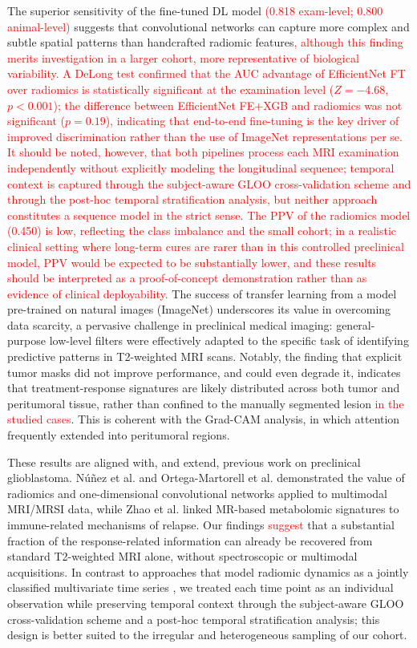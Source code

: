 \documentclass{article}
\begin{document}
The superior sensitivity of the fine-tuned DL model \textcolor{red}{(0.818 exam-level; 0.800 animal-level)} suggests that convolutional networks can capture more complex and subtle spatial patterns than handcrafted radiomic features\textcolor{red}{, although this finding merits investigation in a larger cohort, more representative of biological variability. A DeLong test confirmed that the AUC advantage of EfficientNet FT over radiomics is statistically significant at the examination level ($Z=-4.68$, $p<0.001$); the difference between EfficientNet FE+XGB and radiomics was not significant ($p=0.19$), indicating that end-to-end fine-tuning is the key driver of improved discrimination rather than the use of ImageNet representations per se.} \textcolor{red}{It should be noted, however, that both pipelines process each MRI examination independently without explicitly modeling the longitudinal sequence; temporal context is captured through the subject-aware GLOO cross-validation scheme and through the post-hoc temporal stratification analysis, but neither approach constitutes a sequence model in the strict sense.} \textcolor{red}{The PPV of the radiomics model (0.450) is low, reflecting the class imbalance and the small cohort; in a realistic clinical setting where long-term cures are rarer than in this controlled preclinical model, PPV would be expected to be substantially lower, and these results should be interpreted as a proof-of-concept demonstration rather than as evidence of clinical deployability.} The success of transfer learning from a model pre-trained on natural images (ImageNet) underscores its value in overcoming data scarcity, a pervasive challenge in preclinical medical imaging: general-purpose low-level filters were effectively adapted to the specific task of identifying predictive patterns in T2-weighted MRI scans. Notably, the finding that explicit tumor masks did not improve performance, and could even degrade it, indicates that treatment-response signatures are likely distributed across both tumor and peritumoral tissue, rather than confined to the manually segmented lesion \textcolor{red}{in the studied cases}. This is coherent with the Grad-CAM analysis, in which attention frequently extended into peritumoral regions.

These results are aligned with, and extend, previous work on preclinical glioblastoma. Núñez et al. \cite{interpretingLuisMiguel} and Ortega-Martorell et al. \cite{Ortega-Martorell2023} demonstrated the value of radiomics and one-dimensional convolutional networks applied to multimodal MRI/MRSI data, while Zhao et al. \cite{Zhao2023} linked MR-based metabolomic signatures to immune-related mechanisms of relapse. Our findings \textcolor{red}{suggest} that a substantial fraction of the response-related information can already be recovered from standard T2-weighted MRI alone, without spectroscopic or multimodal acquisitions. In contrast to approaches that model radiomic dynamics as a jointly classified multivariate time series \cite{Prinzi2024}, we treated each time point as an individual observation while preserving temporal context through the subject-aware GLOO cross-validation scheme and a post-hoc temporal stratification analysis; this design is better suited to the irregular and heterogeneous sampling of our cohort.
\end{document}

